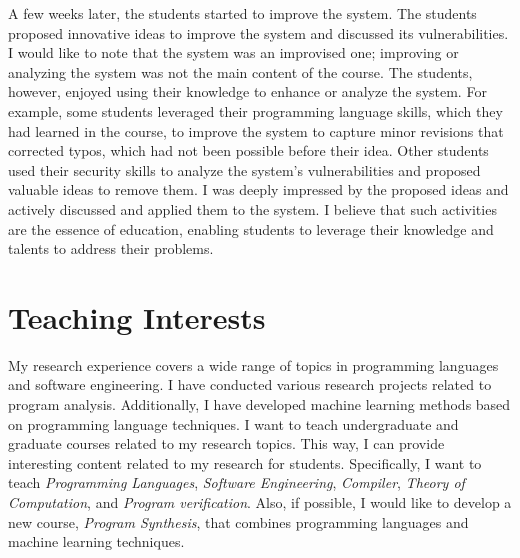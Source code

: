 \documentclass[11pt]{article}
\begin{document}
A few weeks later, the students started to improve the system.
%
The students proposed innovative ideas to improve the system and discussed its vulnerabilities.
%
I would like to note that the system was an improvised one; improving or analyzing the system was not the main content of the course. 
%
The students, however, enjoyed using their knowledge to enhance or analyze the system. 
%
For example, some students leveraged their programming language skills, which they had learned in the course, to improve the system to capture minor revisions that corrected typos, which had not been possible before their idea.
%
Other students used their security skills to analyze the system's vulnerabilities and proposed valuable ideas to remove them. 
%
I was deeply impressed by the proposed ideas and actively discussed and applied them to the system.
%
I believe that such activities are the essence of education, enabling students to leverage their knowledge and talents to address their problems.
%












\section{Teaching Interests}
My research experience covers a wide range of topics in programming languages and software engineering.
%
I have conducted various research projects related to program analysis.
%
Additionally, I have developed machine learning methods based on programming language techniques.
%
I want to teach undergraduate and graduate courses related to my research topics.
%
This way, I can provide interesting content related to my research for students.
%
Specifically, I want to teach {\it Programming Languages}, {\it Software Engineering}, {\it Compiler}, {\it Theory of Computation}, and {\it Program verification}.
%
Also, if possible, I would like to develop a new course, {\it Program Synthesis}, that combines programming languages and machine learning techniques.
\end{document}
